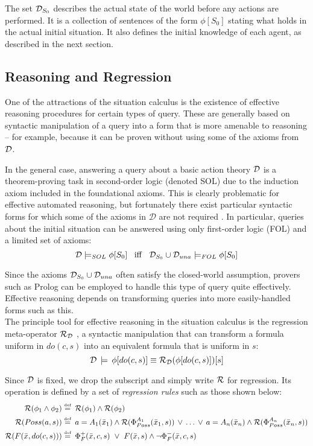 The set $\mathcal{D}_{S_{0}}$ describes the actual state of the world before
any actions are performed. It is a collection of sentences of the
form $\phi[S_{0}]$ stating what holds in the actual initial situation.
It also defines the initial knowledge of each agent, as described
in the next section.


\subsection{Reasoning and Regression}

One of the attractions of the situation calculus is the existence
of effective reasoning procedures for certain types of query. These
are generally based on syntactic manipulation of a query into a form
that is more amenable to reasoning -- for example, because it can
be proven without using some of the axioms from $\mathcal{D}$.

In the general case, answering a query about a basic action theory
$\mathcal{D}$ is a theorem-proving task in second-order logic (denoted SOL)
due to the induction axiom included in the foundational axioms. This
is clearly problematic for effective automated reasoning, but fortunately
there exist particular syntactic forms for which some of the axioms
in $\mathcal{D}$ are not required \cite{pirri99contributions_sitcalc}.
In particular, queries about the initial situation can be answered
using only first-order logic (FOL) and a limited set of axioms:\[
\mathcal{D}\models_{SOL}\phi[S_{0}]\,\,\,\,\,\mathit{\mathrm{iff}}\,\,\,\,\,\mathcal{D}_{S_{0}}\cup\mathcal{D}_{una}\models_{FOL}\phi[S_{0}]\]


Since the axioms $\mathcal{D}_{S_{0}}\cup\mathcal{D}_{una}$ often satisfy the closed-world
assumption, provers such as Prolog can be employed to handle this
type of query quite effectively. Effective reasoning depends on transforming
queries into more easily-handled forms such as this. \\


The principle tool for effective reasoning in the situation calculus
is the regression meta-operator $\mathcal{R}_{\mathcal{D}}$ \cite{pirri99contributions_sitcalc},
a syntactic manipulation that can transform a formula uniform in $do(c,s)$
into an equivalent formula that is uniform in $s$:\[
\mathcal{D}\,\models\,\phi[do(c,s)]\equiv\mathcal{R}_{\mathcal{D}}(\phi[do(c,s)])[s]\]


Since $\mathcal{D}$ is fixed, we drop the subscript and simply write $\mathcal{R}$
for regression. Its operation is defined by a set of \emph{regression
rules} such as those shown below:\begin{align*}
\mathcal{R}(\phi_{1}\wedge\phi_{2})\stackrel{\mbox{\tiny def}}{=} & \,\,\,\mathcal{R}(\phi_{1})\wedge\mathcal{R}(\phi_{2})\\
\mathcal{R}(Poss(a,s))\stackrel{\mbox{\tiny def}}{=} & \,\,\, a=A{}_{1}(\bar{x}_{1})\wedge\mathcal{R}(\Phi_{Poss}^{A_{1}}(\bar{x}_{1},s))\,\vee\,\dots\,\vee\, a=A_{n}(\bar{x}_{n})\wedge\mathcal{R}(\Phi_{Poss}^{A_{n}}(\bar{x}_{n},s))\\
\mathcal{R}(F(\bar{x},do(c,s)))\stackrel{\mbox{\tiny def}}{=} & \,\,\,\Phi_{F}^{+}(\bar{x},c,s)\,\,\vee\,\, F(\bar{x},s)\wedge\neg\Phi_{F}^{-}(\bar{x},c,s)\end{align*}



